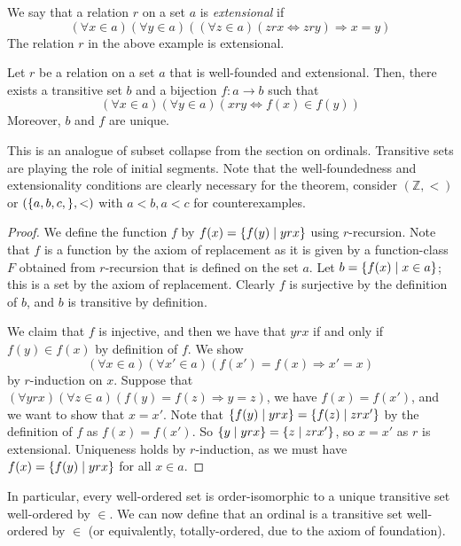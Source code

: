We say that a relation \( r \) on a set \( a \) is \emph{extensional} if
\[ (\forall x \in a)(\forall y \in a)((\forall z \in a)(zrx \Leftrightarrow zry) \Rightarrow x = y) \]
The relation \( r \) in the above example is extensional.
\begin{theorem}
    Let \( r \) be a relation on a set \( a \) that is well-founded and extensional.
    Then, there exists a transitive set \( b \) and a bijection \( f \colon a \to b \) such that
    \[ (\forall x \in a)(\forall y \in a)(x r y \Leftrightarrow f(x) \in f(y)) \]
    Moreover, \( b \) and \( f \) are unique.
\end{theorem}
This is an analogue of subset collapse from the section on ordinals.
Transitive sets are playing the role of initial segments.
Note that the well-foundedness and extensionality conditions are clearly necessary for the theorem, consider \( (\mathbb Z, <) \) or \( (\qty{a,b,c,},<) \) with \( a<b, a<c \) for counterexamples.
\begin{proof}
    We define the function \( f \) by \( f(x) = \qty{f(y) \mid y r x} \) using \( r \)-recursion.
    Note that \( f \) is a function by the axiom of replacement as it is given by a function-class \( F \) obtained from \( r \)-recursion that is defined on the set \( a \).
    Let \( b = \qty{f(x) \mid x \in a} \); this is a set by the axiom of replacement.
    Clearly \( f \) is surjective by the definition of \( b \), and \( b \) is transitive by definition.

    We claim that \( f \) is injective, and then we have that \( yrx \) if and only if \( f(y) \in f(x) \) by definition of \( f \).
    We show
    \[ (\forall x \in a)(\forall x' \in a)(f(x') = f(x) \Rightarrow x' = x) \]
    by \( r \)-induction on \( x \).
    Suppose that \( (\forall y r x)(\forall z \in a)(f(y) = f(z) \Rightarrow y = z) \), we have \( f(x) = f(x') \), and we want to show that \( x = x' \).
    Note that \( \qty{f(y) \mid y r x} = \qty{f(z) \mid z r x'} \) by the definition of \( f \) as \( f(x) = f(x') \).
    So \( \qty{y \mid y r x} = \qty{z \mid z r x'} \), so \( x = x' \) as \( r \) is extensional.
    Uniqueness holds by \( r \)-induction, as we must have \( f(x) = \qty{f(y) \mid y r x} \) for all \( x \in a \).
\end{proof}
In particular, every well-ordered set is order-isomorphic to a unique transitive set well-ordered by \( \in \).
We can now define that an ordinal is a transitive set well-ordered by \( \in \) (or equivalently, totally-ordered, due to the axiom of foundation).
